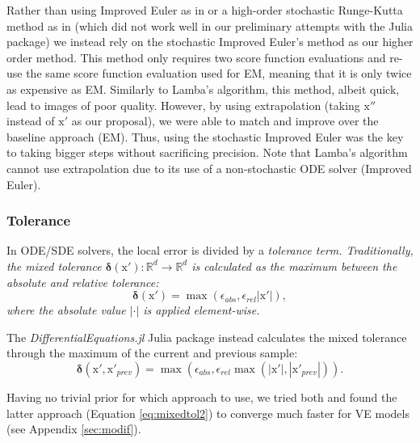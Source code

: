 \documentclass{article}
\newcommand{\bdelta}{\boldsymbol{\delta}}
\newcommand{\x}{\boldsymbol{\mathrm{x}}}
\begin{document}
Rather than using Improved Euler \citep{suli2003introduction} as in \citet{lamba2003adaptive} or a high-order stochastic Runge-Kutta method \citep{rossler2010runge} as in \citet{rackauckas2017adaptive} (which did not work well in our preliminary attempts with the Julia package) we instead rely on the stochastic Improved Euler's method \citep{roberts2012modify} as our higher order method. This method only requires two score function evaluations and re-use the same score function evaluation used for EM, meaning that it is only twice as expensive as EM. Similarly to Lamba's algorithm, this method, albeit quick, lead to images of poor quality. However, by using extrapolation (taking $\x''$ instead of $\x'$ as our proposal), we were able to match and improve over
the baseline approach (EM). Thus, using the stochastic Improved Euler was the key to taking bigger steps without sacrificing precision. Note that Lamba's algorithm cannot use extrapolation due to its use of a non-stochastic ODE solver (Improved Euler).

\subsubsection{Tolerance}

In ODE/SDE solvers, the local error is divided by a \em tolerance \em term.
Traditionally, the mixed tolerance $\bdelta(\x'): \mathbb{R}^d \to \mathbb{R}^d$ is calculated as the maximum between the absolute and relative tolerance:
\begin{equation} 
\bdelta(\x') = \max(\epsilon_{abs}, \epsilon_{rel}|\x'|),
\end{equation}
where the absolute value $|\cdot|$ is applied element-wise.

The {\em DifferentialEquations.jl} Julia package instead calculates the  mixed tolerance 
through the maximum of the current and previous sample:
\begin{equation} \label{eq:mixedtol2}
\bdelta(\x', \x'_{prev}) = \max(\epsilon_{abs}, \epsilon_{rel}\max(|\x'|, |\x'_{prev}|)).\end{equation}

Having no trivial prior for which approach to use, we tried both and found the latter approach (Equation \ref{eq:mixedtol2}) to converge much faster for VE models (see Appendix \ref{sec:modif}).
\end{document}
